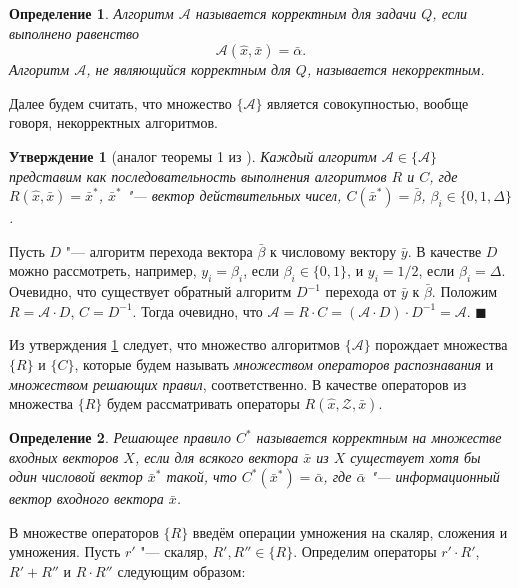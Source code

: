 \documentclass[a4paper, 12pt]{article}
\theoremstyle{plain}
\newtheorem{Pred}{Утверждение}
\newtheorem{Def}{Определение}
\newenvironment{Proof}%
	{\par\noindent{\bf Доказательство.}}%
	{\hfill$\scriptstyle\blacksquare$}
\begin{document}
	\begin{Def}
		Алгоритм $\mathcal{A}$ называется корректным для задачи $Q$, если выполнено равенство
		\[
		\mathcal{A}(\hat{x},\bar{x})=\bar{\alpha}.
		\]
		Алгоритм $\mathcal{A}$, не являющийся корректным для $Q$, называется некорректным.
	\end{Def}
	
	Далее будем считать, что множество $\{\mathcal{A}\}$ является совокупностью, вообще говоря, некорректных алгоритмов.
	
	\begin{Pred}[аналог теоремы 1 из \cite{Zhuravlev1977}]
		\label{pred:decompositon}
		Каждый алгоритм $\mathcal{A}\in\{\mathcal{A}\}$ представим как последовательность выполнения алгоритмов $R$ и $C$, где $R(\hat{x},\bar{x})=\bar{x}^*$, $\bar{x}^*$ "--- вектор действительных чисел, $C(\bar{x}^*)=\bar{\beta}$, $\beta_i\in\{0,1,\Delta\}$.
	\end{Pred}
	
	\begin{Proof}
		Пусть $D$ "--- алгоритм перехода вектора $\bar{\beta}$ к числовому вектору $\bar{y}$. В качестве $D$ можно рассмотреть, например, $y_i=\beta_i$, если $\beta_i\in\{0,1\}$, и $y_i=1/2$, если $\beta_i=\Delta$. Очевидно, что существует обратный алгоритм $D^{-1}$ перехода от $\bar{y}$ к $\bar{\beta}$. Положим $R=\mathcal{A}{\cdot}D$, $C=D^{-1}$. Тогда очевидно, что $\mathcal{A}=R{\cdot}C=(\mathcal{A}{\cdot}D){\cdot}D^{-1}=\mathcal{A}$.
	\end{Proof}
	
	Из утверждения \ref{pred:decompositon} следует, что множество алгоритмов $\{\mathcal{A}\}$ порождает множества $\{R\}$ и $\{C\}$, которые будем называть \textit{множеством операторов распознавания} и \textit{множеством решающих правил}, соответственно. В качестве операторов из множества $\{R\}$ будем рассматривать операторы $R(\hat{x},\mathcal{Z},\bar{x})$.
	
	\begin{Def}
		Решающее правило $C^*$ называется корректным на множестве входных векторов $X$, если для всякого вектора $\bar{x}$ из $X$ существует хотя бы один числовой вектор $\bar{x}^*$ такой, что $C^*(\bar{x}^*)=\bar{\alpha}$, где $\bar{\alpha}$ "--- информационный вектор входного вектора $\bar{x}$.
	\end{Def}
	
	В множестве операторов $\{R\}$ введём операции умножения на скаляр, сложения и умножения. Пусть $r'$ "--- скаляр, $R',R''\in\{R\}$. Определим операторы $r'{\cdot}R'$, $R'+R''$ и $R{\cdot}R''$ следующим образом:
	
\end{document}
